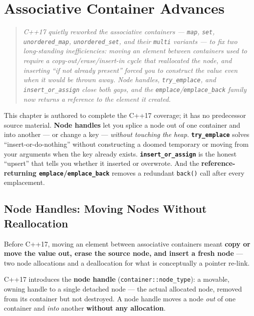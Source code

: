 \chapter{Associative Container Advances}
\label{ch:c17-associative-advances}

\begin{quote}
\emph{C++17 quietly reworked the associative containers --- \texttt{map}, \texttt{set}, \texttt{unordered\_map}, \texttt{unordered\_set}, and their \texttt{multi} variants --- to fix two long-standing inefficiencies: moving an element between containers used to require a copy-out/erase/insert-in cycle that reallocated the node, and inserting ``if not already present'' forced you to construct the value even when it would be thrown away. Node handles, \texttt{try\_emplace}, and \texttt{insert\_or\_assign} close both gaps, and the \texttt{emplace}/\texttt{emplace\_back} family now returns a reference to the element it created.}
\end{quote}

This chapter is authored to complete the C++17 coverage; it has no predecessor source material. \textbf{Node handles} let you splice a node out of one container and into another --- or change a key --- \emph{without touching the heap}. \textbf{\texttt{try\_emplace}} solves ``insert-or-do-nothing'' without constructing a doomed temporary or moving from your arguments when the key already exists. \textbf{\texttt{insert\_or\_assign}} is the honest ``upsert'' that tells you whether it inserted or overwrote. And the \textbf{reference-returning \texttt{emplace}/\texttt{emplace\_back}} removes a redundant \texttt{back()} call after every emplacement.

\section{Node Handles: Moving Nodes Without Reallocation}
\label{sec:c17-node-handles}

Before C++17, moving an element between associative containers meant \textbf{copy or move the value out, erase the source node, and insert a fresh node} --- two node allocations and a deallocation for what is conceptually a pointer re-link.

C++17 introduces the \textbf{node handle} (\texttt{container::node\_type}): a movable, owning handle to a single detached node --- the actual allocated node, removed from its container but not destroyed. A node handle moves a node \emph{out} of one container and \emph{into} another \textbf{without any allocation}.

